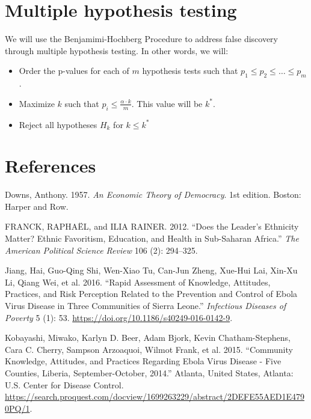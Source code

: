 \documentclass[]{article}
\begin{document}
\section{Multiple hypothesis testing}\label{multiple-hypothesis-testing}

We will use the Benjamimi-Hochberg Procedure to address false discovery
through multiple hypothesis testing. In other words, we will:

\begin{itemize}
  \item Order the p-values for each of $m$ hypothesis tests such that $p_1 \leq p_2 \leq \ldots \leq p_m$.
  \item Maximize $k$ such that $p_i \leq \frac{\alpha \cdot k}{m}$. This value will be $k^*$.
  \item Reject all hypotheses $H_k$ for $k \leq k^*$
\end{itemize}

\section*{References}\label{references}

\hypertarget{refs}{}
\hypertarget{ref-downs_economic_1957}{}
Downs, Anthony. 1957. \emph{An Economic Theory of Democracy}. 1st
edition. Boston: Harper and Row.

\hypertarget{ref-franck_does_2012}{}
FRANCK, RAPHAËL, and ILIA RAINER. 2012. ``Does the Leader's Ethnicity
Matter? Ethnic Favoritism, Education, and Health in Sub-Saharan
Africa.'' \emph{The American Political Science Review} 106 (2):
294--325.

\hypertarget{ref-jiang_rapid_2016}{}
Jiang, Hai, Guo-Qing Shi, Wen-Xiao Tu, Can-Jun Zheng, Xue-Hui Lai,
Xin-Xu Li, Qiang Wei, et al. 2016. ``Rapid Assessment of Knowledge,
Attitudes, Practices, and Risk Perception Related to the Prevention and
Control of Ebola Virus Disease in Three Communities of Sierra Leone.''
\emph{Infectious Diseases of Poverty} 5 (1): 53.
\url{https://doi.org/10.1186/s40249-016-0142-9}.

\hypertarget{ref-kobayashi_community_2015}{}
Kobayashi, Miwako, Karlyn D. Beer, Adam Bjork, Kevin Chatham-Stephens,
Cara C. Cherry, Sampson Arzoaquoi, Wilmot Frank, et al. 2015.
``Community Knowledge, Attitudes, and Practices Regarding Ebola Virus
Disease - Five Counties, Liberia, September-October, 2014.'' Atlanta,
United States, Atlanta: U.S. Center for Disease Control.
\url{https://search.proquest.com/docview/1699263229/abstract/2DEFE55AED1E4790PQ/1}.
\end{document}
